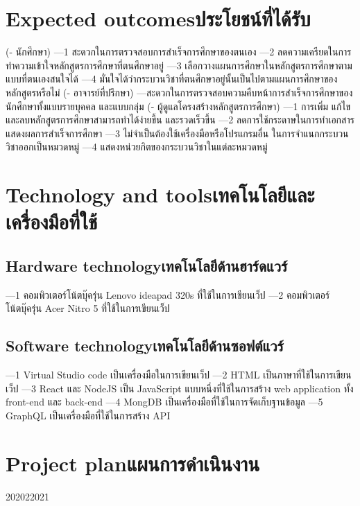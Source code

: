 \section{\ifenglish Expected outcomes\else ประโยชน์ที่ได้รับ\fi}
{(- นักศึกษา)}
{---1 สะดวกในการตรวจสอบการสำเร็จการศึกษาของตนเอง 
}
{---2 ลดความเครียดในการทำความเข้าใจหลักสูตรการศึกษาที่ตนศึกษาอยู่}
{---3 เลือกวางแผนการศึกษาในหลักสูตรการศึกษาตามแบบที่ตนเองสนใจได้}
{---4 มั่นใจได้ว่ากระบวนวิชาที่ตนศึกษาอยู่นั้นเป็นไปตามแผนการศึกษาของหลักสูตรหรือไม่ }
{(- อาจารย์ที่ปรึกษา)}
{---สะดวกในการตรวจสอบความคืบหน้าการสำเร็จการศึกษาของนักศึกษาทั้งแบบรายบุคคล และแบบกลุ่ม }
{(- ผู้ดูแลโครงสร้างหลักสูตรการศึกษา)}
{---1 การเพิ่ม แก้ไข และลบหลักสูตรการศึกษาสามารถทำได้ง่ายขึ้น  และรวดเร็วขึ้น
}
{---2 ลดการใช้กระดาษในการทำเอกสารแสดงผลการสำเร็จการศึกษา 
}
{---3 ไม่จำเป็นต้องใช้เครื่องมือหรือโปรแกรมอื่น ในการจำแนกกระบวนวิชาออกเป็นหมวดหมู่  }
{---4 แสดงหน่วยกิตของกระบวนวิชาในแต่ละหมวดหมู่
}
\section{\ifenglish Technology and tools\else เทคโนโลยีและเครื่องมือที่ใช้\fi}

\subsection{\ifenglish Hardware technology\else เทคโนโลยีด้านฮาร์ดแวร์\fi}
{---1 คอมพิวเตอร์โน้ตบุ๊ครุ่น Lenovo ideapad 320s ที่ใช้ในการเขียนเว็ป
}
{---2 คอมพิวเตอร์โน้ตบุ๊ครุ่น Acer Nitro 5  ที่ใช้ในการเขียนเว็ป
}
\subsection{\ifenglish Software technology\else เทคโนโลยีด้านซอฟต์แวร์\fi}
{---1 Virtual Studio code เป็นเครื่องมือในการเขียนเว็ป}
{---2 HTML เป็นภาษาที่ใช้ในการเขียนเว็ป}
{---3 React และ NodeJS เป็น JavaScript แบบหนึ่งที่ใช้ในการสร้าง web application ทั้ง front-end และ back-end }
{---4 MongDB เป็นเครื่องมือที่ใช้ในการจัดเก็บฐานข้อมูล}
{---5 GraphQL เป็นเครื่องมือที่ใช้ในการสร้าง API }
\section{\ifenglish Project plan\else แผนการดำเนินงาน\fi}


\begin{plan}{6}{2020}{2}{2021}
\end{plan}

